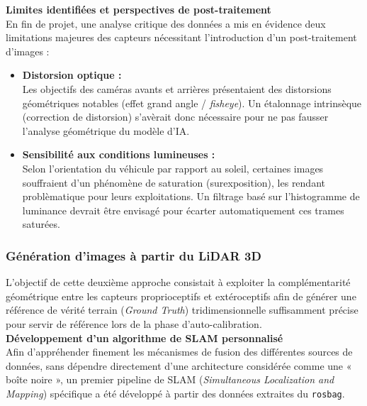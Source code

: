 \documentclass[12pt,a4paper,oneside]{report}
\begin{document}
\par\bigskip
\par\bigskip

\hspace*{0.4cm}\textbf{Limites identifiées et perspectives de post-traitement }\\

\hspace*{.3cm} En fin de projet, une analyse critique des données a mis en évidence deux limitations majeures des capteurs nécessitant l'introduction d'un post-traitement d'images :
\begin{itemize}
    \item \textbf{Distorsion optique :}\\
 Les objectifs des caméras avants et arrières présentaient des distorsions géométriques notables (effet grand angle / \textit{fisheye}). Un étalonnage intrinsèque (correction de distorsion) s'avèrait donc nécessaire pour ne pas fausser l'analyse géométrique du modèle d'IA.
    \item \textbf{Sensibilité aux conditions lumineuses :}\\
 Selon l'orientation du véhicule par rapport au soleil, certaines images souffraient d'un phénomène de saturation (surexposition), les rendant problèmatique pour leurs exploitations. Un filtrage basé sur l'histogramme de luminance devrait être envisagé pour écarter automatiquement ces trames saturées.
\end{itemize}

\newpage

\subsubsection{Génération d'images à partir du LiDAR 3D}

\hspace*{0.3cm}L'objectif de cette deuxième approche consistait à exploiter la complémentarité géométrique entre les capteurs proprioceptifs et extéroceptifs afin de générer une référence de vérité terrain (\textit{Ground Truth}) tridimensionnelle suffisamment précise pour servir de référence lors de la phase d'auto-calibration.\\

\hspace*{0.4cm}\textbf{Développement d'un algorithme de SLAM personnalisé}\\

\hspace*{.3cm}Afin d'appréhender finement les mécanismes de fusion des différentes sources de données, sans dépendre directement d'une architecture considérée comme une « boîte noire », un premier pipeline de SLAM (\textit{Simultaneous Localization and Mapping}) spécifique a été développé à partir des données extraites du \texttt{rosbag}.\\
\end{document}
